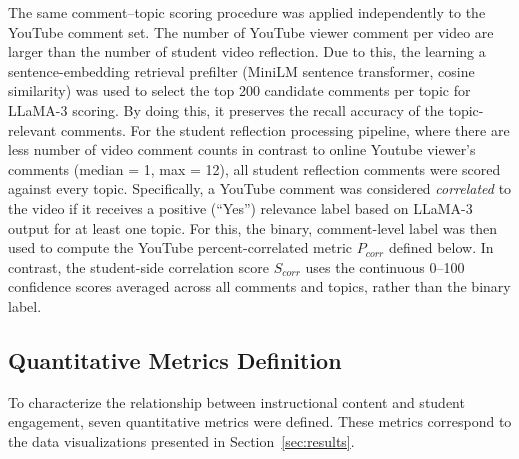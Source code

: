 \documentclass[fleqn,10pt]{JLA_article} %
\begin{document}
The same comment--topic scoring procedure was applied independently to the YouTube comment set. The number of YouTube viewer comment per video are larger than the number of student video reflection. Due to this, the learning a sentence-embedding retrieval prefilter (MiniLM sentence transformer, cosine similarity) was used to select the top 200 candidate comments per topic for LLaMA-3 scoring. By doing this, it preserves the recall accuracy of the topic-relevant comments. For the student reflection processing pipeline, where there are less number of video comment counts in contrast to online Youtube viewer's comments (median = 1, max = 12), all student reflection comments were scored against every topic. Specifically, a YouTube comment was considered \emph{correlated} to the video if it receives a positive (``Yes'') relevance label based on LLaMA-3 output for at least one topic. For this, the binary, comment-level label was then used to compute the YouTube percent-correlated metric $P_{corr}$ defined below. In contrast, the student-side correlation score $S_{corr}$ uses the continuous 0--100 confidence scores averaged across all comments and topics, rather than the binary label.

\subsection{Quantitative Metrics Definition}

To characterize the relationship between instructional content and student engagement, seven quantitative metrics were defined. These metrics correspond to the data visualizations presented in Section~\ref{sec:results}.
\end{document}
